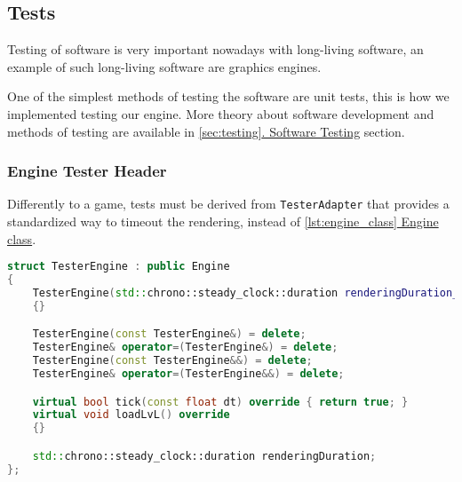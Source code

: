 \newpage
\subsection{Tests}
\label{sec:tests}
\hspace{\parindent}Testing of software is very important nowadays with long-living software, an example of such long-living software are graphics engines.

One of the simplest methods of testing the software are unit tests, this is how we implemented testing our engine. More theory about software development and methods of testing are available in \hyperref[sec:testing]{\ref*{sec:testing}. Software Testing} section.

\subsubsection{Engine Tester Header}
\label{sec:tester_adapter}
\hspace{\parindent}
Differently to a game, tests must be derived from \texttt{TesterAdapter} that provides a standardized way to timeout the rendering, instead of \hyperref[lst:engine_class]{\ref*{lst:engine_class} Engine class}. 
\begin{lstlisting}[language=c++, caption=Tester Engine class (./engine/tests/tester.cpp)]
struct TesterEngine : public Engine
{
    TesterEngine(std::chrono::steady_clock::duration renderingDuration_) : renderingDuration{renderingDuration_}
    {}

    TesterEngine(const TesterEngine&) = delete;
    TesterEngine& operator=(TesterEngine&) = delete;
    TesterEngine(const TesterEngine&&) = delete;
    TesterEngine& operator=(TesterEngine&&) = delete;

    virtual bool tick(const float dt) override { return true; }
    virtual void loadLvL() override
    {}

    std::chrono::steady_clock::duration renderingDuration;
};
\end{lstlisting}


